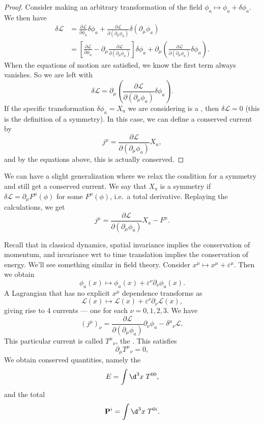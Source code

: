 \documentclass[a4paper]{article}
\begin{document}
\begin{proof}
  Consider making an arbitrary transformation of the field $\phi_a \mapsto \phi_a + \delta \phi_a$. We then have
  \begin{align*}
    \delta \mathcal{L} &= \frac{\partial \mathcal{L}}{\partial \phi_a} \delta \phi_a + \frac{\partial \mathcal{L}}{\partial(\partial_\mu \phi_a)} \delta(\partial_\mu \phi_a)\\
    &= \left[\frac{\partial \mathcal{L}}{\partial \phi_a} - \partial_\mu \frac{\partial \mathcal{L}}{\partial(\partial_\mu \phi_a)}\right] \delta \phi_a + \partial_\mu \left(\frac{\partial \mathcal{L}}{\partial(\partial_\mu \phi_a)} \delta \phi_a\right).
  \end{align*}
  When the equations of motion are satisfied, we know the first term always vanishes. So we are left with
  \[
    \delta \mathcal{L} = \partial_\mu \left(\frac{\partial \mathcal{L}}{\partial(\partial_\mu \phi_a)} \delta \phi_a\right).
  \]
  If the specific transformation $\delta \phi_a = X_a$ we are considering is a , then $\delta\mathcal{L} = 0$ (this is the definition of a symmetry). In this case, we can define a conserved current by
  \[
    j^\mu = \frac{\partial \mathcal{L}}{\partial (\partial_\mu \phi_a)}X_a,
  \]
  and by the equations above, this is actually conserved.
\end{proof}
We can have a slight generalization where we relax the condition for a symmetry and still get a conserved current. We say that $X_a$ is a symmetry if $\delta \mathcal{L} = \partial_\mu F^\mu(\phi)$ for some $F^\mu(\phi)$, i.e.\ a total derivative. Replaying the calculations, we get
\[
  j^\mu = \frac{\partial \mathcal{L}}{\partial (\partial_\mu \phi_a)} X_a - F^\mu.
\]
\begin{eg}
  Recall that in classical dynamics, spatial invariance implies the conservation of momentum, and invariance wrt to time translation implies the conservation of energy. We'll see something similar in field theory. Consider $x^\mu \mapsto x^\mu + \varepsilon^\mu$. Then we obtain
  \[
    \phi_a(x) \mapsto \phi_a(x) + \varepsilon^\nu \partial_\nu \phi_a(x).
  \]
  A Lagrangian that has no explicit $x^\mu$ dependence transforms as
  \[
    \mathcal{L}(x) \mapsto \mathcal{L}(x) + \varepsilon^\nu \partial_\nu \mathcal{L}(x),
  \]
  giving rise to 4 currents --- one for each $\nu = 0, 1, 2, 3$. We have
  \[
    (j^\mu)_\nu = \frac{\partial \mathcal{L}}{\partial (\partial_\mu \phi_a)} \partial_\nu \phi_a - \delta^\mu\!_\nu \mathcal{L},
  \]
  This particular current is called $T^\mu\!_\nu$, the . This satisfies
  \[
    \partial_\mu T^\mu\!_\nu = 0,
  \]
  We obtain conserved quantities, namely the 
  \[
    E = \int \d^3 x\;T^{00},
  \]
  and the total 
  \[
    \mathbf{P}^i = \int \d^3 x\; T^{0i}.
  \]
\end{eg}
\end{document}
